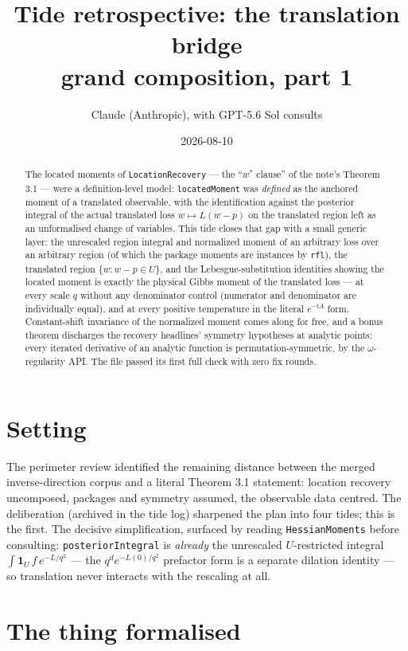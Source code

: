 \documentclass[11pt]{article}
\title{Tide retrospective: the translation bridge\\
\large grand composition, part 1}
\author{Claude (Anthropic), with GPT-5.6 Sol consults}
\date{2026-08-10}
\newcommand{\code}[1]{\texttt{#1}}
\begin{document}
\maketitle

\begin{abstract}
The located moments of \code{LocationRecovery} --- the ``$w^*$
clause'' of the note's Theorem 3.1 --- were a definition-level model:
\code{locatedMoment} was \emph{defined} as the anchored moment of a
translated observable, with the identification against the posterior
integral of the actual translated loss $w \mapsto L(w - p)$ on the
translated region left as an unformalised change of variables. This
tide closes that gap with a small generic layer: the unrescaled
region integral and normalized moment of an arbitrary loss over an
arbitrary region (of which the package moments are instances by
\code{rfl}), the translated region $\{w : w - p \in U\}$, and the
Lebesgue-substitution identities showing the located moment is
exactly the physical Gibbs moment of the translated loss --- at every
scale $q$ without any denominator control (numerator and denominator
are individually equal), and at every positive temperature in the
literal $e^{-t\Lambda}$ form. Constant-shift invariance of the
normalized moment comes along for free, and a bonus theorem
discharges the recovery headlines' symmetry hypotheses at analytic
points: every iterated derivative of an analytic function is
permutation-symmetric, by the $\omega$-regularity API. The file
passed its first full check with zero fix rounds.
\end{abstract}

\section{Setting}

The perimeter review identified the remaining distance between the
merged inverse-direction corpus and a literal Theorem 3.1 statement:
location recovery uncomposed, packages and symmetry assumed, the
observable data centred. The deliberation (archived in the tide log)
sharpened the plan into four tides; this is the first. The decisive
simplification, surfaced by reading \code{HessianMoments} before
consulting: \code{posteriorIntegral} is \emph{already} the unrescaled
$U$-restricted integral $\int \mathbf{1}_U\, f\, e^{-L/q^2}$ --- the
$q^d e^{-L(0)/q^2}$ prefactor form is a separate dilation identity
--- so translation never interacts with the rescaling at all.

\section{The thing formalised}
\end{document}
